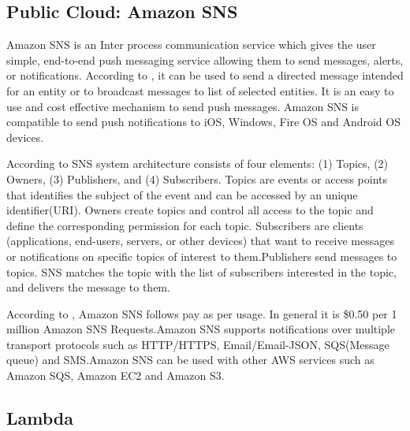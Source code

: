 \subsection{ Public Cloud: Amazon SNS}

     Amazon SNS is an Inter process communication service which gives
     the user simple, end-to-end push messaging service allowing them
     to send messages, alerts, or notifications. According to
     \cite{www-sns-webpage}, it can be used to send a directed message
     intended for an entity or to broadcast messages to list of
     selected entities. It is an easy to use and cost effective
     mechanism to send push messages. Amazon SNS is compatible to send
     push notifications to iOS, Windows, Fire OS and Android OS
     devices.

     According to \cite{www-sns-blog} SNS system architecture consists 
     of four elements: (1) Topics, (2) Owners, (3) Publishers, and
     (4) Subscribers. Topics are events or access points that identifies
     the subject of the event and can be accessed by an unique
     identifier(URI). Owners create topics and control all access to
     the topic and define the corresponding permission for each
     topic. Subscribers are clients (applications, end-users,
     servers, or other devices) that want to receive messages or
     notifications on specific topics of interest to them.Publishers
     send messages to topics. SNS matches the topic with the list of
     subscribers interested in the topic, and delivers the message to
     them.

     According to \cite{www-sns-faq}, Amazon SNS follows pay as per
     usage. In general it is \$0.50 per 1 million Amazon SNS
     Requests.Amazon SNS supports notifications over multiple
     transport protocols such as HTTP/HTTPS, Email/Email-JSON,
     SQS(Message queue) and SMS.Amazon SNS can be used with other AWS
     services such as Amazon SQS, Amazon EC2 and Amazon S3.

\subsection{ Lambda}

